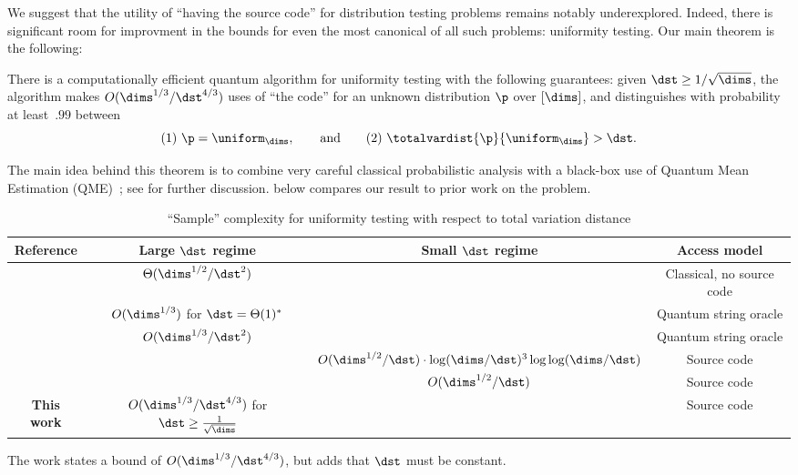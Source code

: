\documentclass[11pt]{article}
\begin{document}
We suggest that the utility of ``having the source code'' for distribution testing problems remains notably underexplored.
Indeed, there is significant room for improvment in the bounds for even the most canonical of all such problems: uniformity testing.  
Our main theorem is the following:
\begin{theorem}\label{thm:main}
  There is a computationally efficient quantum algorithm for uniformity testing with the following guarantees: given $\dst \geq 1/\sqrt{\dims}$, the algorithm makes $O(\dims^{1/3}/\dst^{4/3})$ uses of  ``the code'' for an unknown distribution $\p$ over $[\dims]$, and distinguishes with probability at least~$.99$ between 
  \begin{equation}
      (1)~\p=\uniform_\dims, \qquad \textrm{and}\qquad (2)~\totalvardist{\p}{\uniform_\dims} > \dst.    
  \end{equation}
\end{theorem}
The main idea behind this theorem is to combine very careful classical probabilistic analysis with a black-box use of Quantum Mean Estimation (QME)~\cite{Gro98,BHT98,Hei02,Mon15,Ham21,KO23}; see  for further discussion.
 below compares our result to prior work on the problem.
\begin{table}[b]  
%
  \begin{tabular}{cccc}
  \toprule
  Reference  & Large $\dst$ regime    & Small $\dst$ regime  &  Access model \\
  \midrule
  \cite{Paninski08,AcharyaDK15} \hspace{-1em} & $\Theta(\dims^{1/2}/\dst^2)$ & & Classical, no source code \\
  \cite{BHH11} & $O(\dims^{1/3})$ for $\dst = \Theta(1)^*$  & & Quantum string oracle \\
  \cite{CFMdW10} & $O(\dims^{1/3}/\dst^2)$ & & Quantum string oracle \\
  \cite{GL20} & & \hspace{-2em}$O(\dims^{1/2}/\dst) \cdot \log(\dims/\dst)^3 \log \log(\dims/\dst)$\hspace{-1em} & Source code  \\
  \cite{LuoWL24} & & $O(\dims^{1/2}/\dst)$ & Source code \\
  \bf{}This work  & $O(\dims^{1/3}/\dst^{4/3})$ for $\dst\geq \frac{1}{\sqrt\dims}$ & & Source code \\
  \bottomrule
  \end{tabular}
  {\footnotesize *The work states a bound of $O(\dims^{1/3}/\dst^{4/3})$, but adds that $\dst$ must be constant.}
  \caption{``Sample'' complexity for uniformity testing with respect to total variation distance \label{table:1}}
\end{table}
\end{document}
